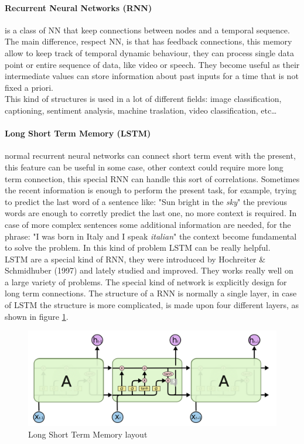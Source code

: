 \documentclass[%
    corpo=12pt,
    twoside,
    oldstyle,
    autoretitolo,
    greek,
    evenboxes,
]{toptesi}
\begin{document}
\paragraph{Recurrent Neural Networks (RNN)}  is a class of NN that keep connections between nodes and a temporal sequence. The main difference, respect NN, is that has feedback connections, this memory allow to keep track of temporal dynamic behaviour, they can process single data point or entire sequence of data, like video or speech. They become useful as their intermediate values can store information about past inputs for a time that is not fixed a priori.\\
This kind of structures is used in a lot of different fields: image classification, captioning, sentiment analysis, machine traslation, video classification, etc\dots

\paragraph{Long Short Term Memory (LSTM)} normal recurrent neural networks can connect short term event with the present, this feature can be useful in some case, other context could require more long term connection, this special RNN can handle this sort of correlations. Sometimes the recent information is enough to perform the present task, for example, trying to predict the last word of a sentence like: "Sun bright in the \textit{sky}" the previous words are enough to corretly predict the last one, no more context is required. In case of more complex sentences some additional information are needed, for the phrase: "I was born in Italy and I speak \textit{italian}" the context become fundamental to solve the problem. In this kind of problem LSTM can be really helpful.\\
LSTM are a special kind of RNN, they were introduced by Hochreiter \& Schmidhuber (1997) \cite{lstm} and lately studied and improved. They works really well on a large variety of problems. The special kind of network is explicitly design for long term connections.
The structure of a RNN is normally a single layer, in case of LSTM the structure is more complicated, is made upon four different layers, as shown in figure \ref{fig:lstm}.

\begin{figure}[!ht]
  \includegraphics[width=\linewidth]{figure/lstm.png}
  \caption{Long Short Term Memory layout \cite{lstm_image}}
  \label{fig:lstm}
\end{figure}
\end{document}
